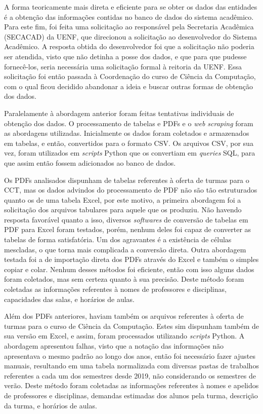 A forma teoricamente mais direta e eficiente para se obter os dados das entidades é a obtenção das informações contidas no banco de dados do sistema acadêmico. Para este fim, foi feita uma solicitação ao responsável pela Secretaria Acadêmica (SECACAD) da UENF, que direcionou a solicitação ao desenvolvedor do Sistema Acadêmico. A resposta obtida do desenvolvedor foi que a solicitação não poderia ser atendida, visto que não detinha a posse dos dados, e que para que pudesse fornecê-los, seria necessária uma solicitação formal à reitoria da UENF. Essa solicitação foi então passada à Coordenação do curso de Ciência da Computação, com o qual ficou decidido abandonar a ideia e buscar outras formas de obtenção dos dados.

Paralelamente à abordagem anterior foram feitas tentativas individuais de obtenção dos dados. O processamento de tabelas e PDFs e o \textit{web scraping} foram as abordagens utilizadas. Inicialmente os dados foram coletados e armazenados em tabelas, e então, convertidos para o formato CSV. Os arquivos CSV, por sua vez, foram utilizados em \textit{scripts} Python que os convertiam em \textit{queries} SQL, para que assim então fossem adicionados ao banco de dados.

Os PDFs analisados dispunham de tabelas referentes à oferta de turmas para o CCT, mas os dados advindos do processamento de PDF não são tão estruturados quanto os de uma tabela Excel, por este motivo, a primeira abordagem foi a solicitação dos arquivos tabulares para aquele que os produziu. Não havendo resposta favorável quanto a isso, diversos \textit{softwares} de conversão de tabelas em PDF para Excel foram testados, porém, nenhum deles foi capaz de converter as tabelas de forma satisfatória. Um dos agravantes é a existência de células mescladas, o que torna mais complicada a conversão direta. Outra abordagem testada foi a de importação direta dos PDFs através do Excel e também o simples copiar e colar. Nenhum desses métodos foi eficiente, então com isso alguns dados foram coletados, mas sem certeza quanto à sua precisão. Deste método foram coletadas as informações referentes à nomes de professores e disciplinas, capacidades das salas, e horários de aulas.

Além dos PDFs anteriores, haviam também os arquivos referentes à oferta de turmas para o curso de Ciência da Computação. Estes sim dispunham também de sua versão em Excel, e assim, foram processados utilizando \textit{scripts} Python. A abordagem apresentou falhas, visto que a notação das informações não apresentava o mesmo padrão ao longo dos anos, então foi necessário fazer ajustes manuais, resultando em uma tabela normalizada com diversas pastas de trabalhos referentes a cada um dos semestres desde 2019, não considerando os semestres de verão. Deste método foram coletadas as informações referentes à nomes e apelidos de professores e disciplinas, demandas estimadas dos alunos pela turma, descrição da turma, e horários de aulas.

